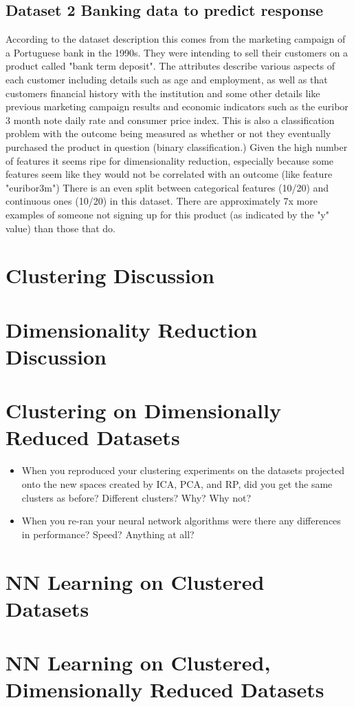 \documentclass[10pt]{article}
\newcommand{\datasettwo}{Banking data to predict response}
\begin{document}
    \subsection{Dataset 2 \datasettwo}\label{subsec:dataset-2datasettwo}
    According to the dataset description this comes from the marketing campaign of a Portuguese bank in the 1990s.\cite{Dua:2019}
    They were intending to sell their customers on a product called "bank term deposit".
    The attributes describe various aspects of each customer including details such as age and employment, as well as that customers financial history with the institution and some other details like previous marketing campaign results and economic indicators such as the euribor 3 month note daily rate and consumer price index.
    This is also a classification problem with the outcome being measured as whether or not they eventually purchased the product in question (binary classification.)
    Given the high number of features it seems ripe for dimensionality reduction, especially because some features seem like they would not be correlated with an outcome (like feature "euribor3m")
    There is an even split between categorical features (10/20) and continuous ones (10/20) in this dataset.
    There are approximately 7x more examples of someone not signing up for this product (as indicated by the "y" value) than those that do.


    \section{Clustering Discussion}\label{sec:clustering-discussion}
    


    \section{Dimensionality Reduction Discussion}\label{sec:dimensionality-reduction-discussion}

    


    \section{Clustering on Dimensionally Reduced Datasets}
    \begin{itemize}
        \item When you reproduced your clustering experiments on the datasets projected onto the new spaces created by ICA, PCA, and RP, did you get the same clusters as before? Different clusters? Why? Why not?
        \item When you re-ran your neural network algorithms were there any differences in performance? Speed? Anything at all?
    \end{itemize}

    \section{NN Learning on Clustered Datasets}

    \section{NN Learning on Clustered, Dimensionally Reduced Datasets}


    
    
\end{document}
